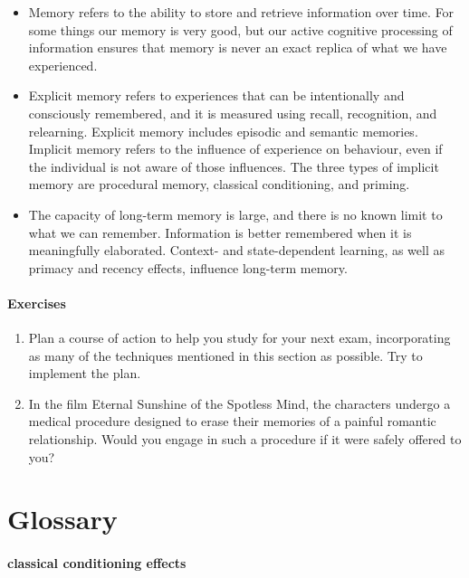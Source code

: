 \documentclass[
]{krantz}
\providecommand{\tightlist}{%
  \setlength{\itemsep}{0pt}\setlength{\parskip}{0pt}}
\begin{document}
\begin{itemize}
\tightlist
\item
  Memory refers to the ability to store and retrieve information over time. For some things our memory is very good, but our active cognitive processing of information ensures that memory is never an exact replica of what we have experienced.
\item
  Explicit memory refers to experiences that can be intentionally and consciously remembered, and it is measured using recall, recognition, and relearning. Explicit memory includes episodic and semantic memories. Implicit memory refers to the influence of experience on behaviour, even if the individual is not aware of those influences. The three types of implicit memory are procedural memory, classical conditioning, and priming.
\item
  The capacity of long-term memory is large, and there is no known limit to what we can remember. Information is better remembered when it is meaningfully elaborated. Context- and state-dependent learning, as well as primacy and recency effects, influence long-term memory.
\end{itemize}

\paragraph*{Exercises}\label{exercises-4}

\begin{enumerate}
\def\labelenumi{\arabic{enumi}.}
\tightlist
\item
  Plan a course of action to help you study for your next exam, incorporating as many of the techniques mentioned in this section as possible. Try to implement the plan.
\item
  In the film Eternal Sunshine of the Spotless Mind, the characters undergo a medical procedure designed to erase their memories of a painful romantic relationship. Would you engage in such a procedure if it were safely offered to you?
\end{enumerate}

\section{Glossary}\label{glossary-4}

\paragraph*{classical conditioning effects}\label{classical-conditioning-effects}
\end{document}
